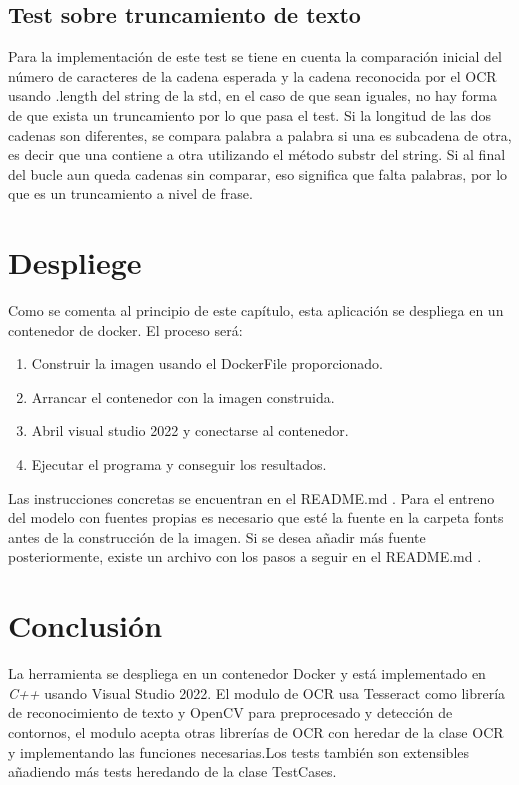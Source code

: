 \subsection{Test sobre truncamiento de texto}
Para la implementación de este test se tiene en cuenta la comparación inicial del número de caracteres de la cadena esperada y la cadena reconocida por el OCR usando .length del string de la std, en el caso de que sean iguales, no hay forma de que exista un truncamiento por lo que pasa el test.
Si la longitud de las dos cadenas son diferentes, se compara palabra a palabra si una es subcadena de otra, es decir que una contiene a otra utilizando el método substr del string.
Si al final del bucle aun queda cadenas sin comparar, eso significa que falta palabras, por lo que es un truncamiento a nivel de frase.

\section{Despliege}
Como se comenta al principio de este capítulo, esta aplicación se despliega en un contenedor de docker. El proceso será:
\begin{enumerate}
	\item Construir la imagen usando el DockerFile proporcionado.
	\item Arrancar el contenedor con la imagen construida.
	\item Abril visual studio 2022 y conectarse al contenedor.
	\item Ejecutar el programa y conseguir los resultados.
\end{enumerate}
Las instrucciones concretas se encuentran en el README.md .
Para el entreno del modelo con fuentes propias es necesario que esté la fuente en la carpeta fonts antes de la construcción de la imagen. Si se desea añadir más fuente posteriormente, existe un archivo con los pasos a seguir en el README.md .
\section{Conclusión}
La herramienta se despliega en un contenedor Docker y está implementado en \emph{C++} usando Visual Studio 2022. El modulo de OCR usa Tesseract como librería de reconocimiento de texto y OpenCV para preprocesado y detección de contornos, el modulo acepta otras librerías de OCR con heredar de la clase OCR y implementando las funciones necesarias.Los tests también son extensibles añadiendo más tests heredando de la clase TestCases.

